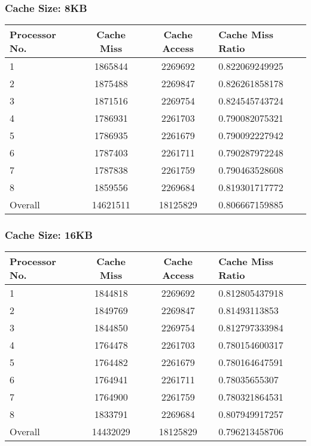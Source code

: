 \documentclass[]{article}
\begin{document}
\subsubsection{Cache Size: 8KB}
\begin{tabularx}{\textwidth}{ | l | c | c | X | }
\hline
Processor No.    & Cache Miss    & Cache Access  &   Cache Miss Ratio \\
\hline
1    & 1865844  & 2269692    & 0.822069249925 \\
\hline
2    & 1875488  & 2269847    & 0.826261858178 \\
\hline
3    & 1871516  & 2269754    & 0.824545743724 \\
\hline
4    & 1786931  & 2261703    & 0.790082075321 \\
\hline
5    & 1786935  & 2261679    & 0.790092227942 \\
\hline
6    & 1787403  & 2261711    & 0.790287972248 \\
\hline
7    & 1787838  & 2261759    & 0.790463528608 \\
\hline
8    & 1859556  & 2269684    & 0.819301717772 \\
\hline
Overall & 14621511    & 18125829  & 0.806667159885 \\
\hline
\end{tabularx}
\subsubsection{Cache Size: 16KB}
\begin{tabularx}{\textwidth}{ | l | c | c | X | }
\hline
Processor No.    & Cache Miss    & Cache Access  &   Cache Miss Ratio \\
\hline
1    & 1844818  & 2269692    & 0.812805437918 \\
\hline
2    & 1849769  & 2269847    & 0.81493113853 \\
\hline
3    & 1844850  & 2269754    & 0.812797333984 \\
\hline
4    & 1764478  & 2261703    & 0.780154600317 \\
\hline
5    & 1764482  & 2261679    & 0.780164647591 \\
\hline
6    & 1764941  & 2261711    & 0.78035655307 \\
\hline
7    & 1764900  & 2261759    & 0.780321864531 \\
\hline
8    & 1833791  & 2269684    & 0.807949917257 \\
\hline
Overall & 14432029    & 18125829  & 0.796213458706 \\
\hline
\end{tabularx}
\end{document}
